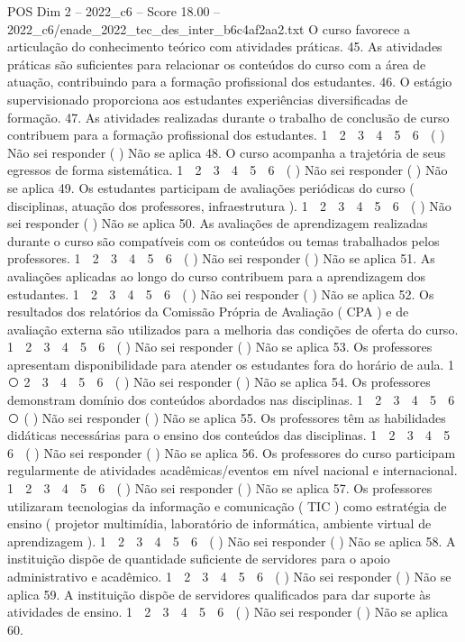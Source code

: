 \begin{textsample}{POS Dim 2 – 2022\_c6 – Score 18.00 – 2022\_c6/enade\_2022\_tec\_des\_inter\_b6c4af2aa2.txt}
O curso favorece a articulação do conhecimento teórico com atividades práticas. 45.
As atividades práticas são suficientes para relacionar os conteúdos do curso com a área de atuação, contribuindo para a formação profissional dos estudantes. 46.
O estágio supervisionado proporciona aos estudantes experiências diversificadas de formação. 47.
As atividades realizadas durante o trabalho de conclusão de curso contribuem para a formação profissional dos estudantes. 1 ⃝ 2 ⃝ 3 ⃝ 4 ⃝ 5 ⃝ 6 ⃝ ( ) Não sei responder ( ) Não se aplica 48.
O curso acompanha a trajetória de seus egressos de forma sistemática. 1 ⃝ 2 ⃝ 3 ⃝ 4 ⃝ 5 ⃝ 6 ⃝ ( ) Não sei responder ( ) Não se aplica 49.
Os estudantes participam de avaliações periódicas do curso ( disciplinas, atuação dos professores, infraestrutura ). 1 ⃝ 2 ⃝ 3 ⃝ 4 ⃝ 5 ⃝ 6 ⃝ ( ) Não sei responder ( ) Não se aplica 50.
As avaliações de aprendizagem realizadas durante o curso são compatíveis com os conteúdos ou temas trabalhados pelos professores. 1 ⃝ 2 ⃝ 3 ⃝ 4 ⃝ 5 ⃝ 6 ⃝ ( ) Não sei responder ( ) Não se aplica 51.
As avaliações aplicadas ao longo do curso contribuem para a aprendizagem dos estudantes. 1 ⃝ 2 ⃝ 3 ⃝ 4 ⃝ 5 ⃝ 6 ⃝ ( ) Não sei responder ( ) Não se aplica 52.
Os resultados dos relatórios da Comissão Própria de Avaliação ( CPA ) e de avaliação externa são utilizados para a melhoria das condições de oferta do curso. 1 ⃝ 2 ⃝ 3 ⃝ 4 ⃝ 5 ⃝ 6 ⃝ ( ) Não sei responder ( ) Não se aplica 53.
Os professores apresentam disponibilidade para atender os estudantes fora do horário de aula. 1 ⃝ 2 ⃝ 3 ⃝ 4 ⃝ 5 ⃝ 6 ⃝ ( ) Não sei responder ( ) Não se aplica 54.
Os professores demonstram domínio dos conteúdos abordados nas disciplinas. 1 ⃝ 2 ⃝ 3 ⃝ 4 ⃝ 5 ⃝ 6 ⃝ ( ) Não sei responder ( ) Não se aplica 55.
Os professores têm as habilidades didáticas necessárias para o ensino dos conteúdos das disciplinas. 1 ⃝ 2 ⃝ 3 ⃝ 4 ⃝ 5 ⃝ 6 ⃝ ( ) Não sei responder ( ) Não se aplica 56.
Os professores do curso participam regularmente de atividades acadêmicas/eventos em nível nacional e internacional. 1 ⃝ 2 ⃝ 3 ⃝ 4 ⃝ 5 ⃝ 6 ⃝ ( ) Não sei responder ( ) Não se aplica 57.
Os professores utilizaram tecnologias da informação e comunicação ( TIC ) como estratégia de ensino ( projetor multimídia, laboratório de informática, ambiente virtual de aprendizagem ). 1 ⃝ 2 ⃝ 3 ⃝ 4 ⃝ 5 ⃝ 6 ⃝ ( ) Não sei responder ( ) Não se aplica 58.
A instituição dispõe de quantidade suficiente de servidores para o apoio administrativo e acadêmico. 1 ⃝ 2 ⃝ 3 ⃝ 4 ⃝ 5 ⃝ 6 ⃝ ( ) Não sei responder ( ) Não se aplica 59.
A instituição dispõe de servidores qualificados para dar suporte às atividades de ensino. 1 ⃝ 2 ⃝ 3 ⃝ 4 ⃝ 5 ⃝ 6 ⃝ ( ) Não sei responder ( ) Não se aplica 60.

\end{textsample}
